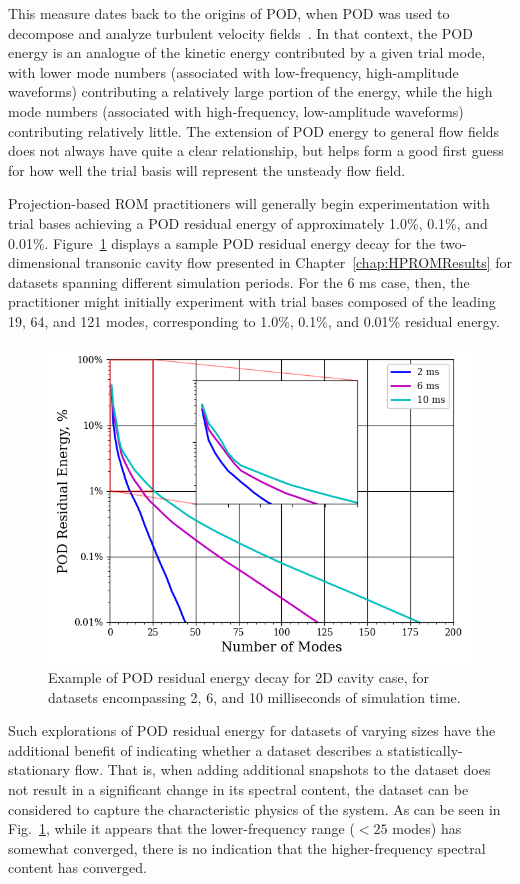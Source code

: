 This measure dates back to the origins of POD, when POD was used to decompose and analyze turbulent velocity fields~\cite{berkoozPOD}. In that context, the POD energy is an analogue of the kinetic energy contributed by a given trial mode, with lower mode numbers (associated with low-frequency, high-amplitude waveforms) contributing a relatively large portion of the energy, while the high mode numbers (associated with high-frequency, low-amplitude waveforms) contributing relatively little. The extension of POD energy to general flow fields does not always have quite a clear relationship, but helps form a good first guess for how well the trial basis will represent the unsteady flow field.

Projection-based ROM practitioners will generally begin experimentation with trial bases achieving a POD residual energy of approximately 1.0\%, 0.1\%, and 0.01\%. Figure~\ref{fig:samplePODEnergy} displays a sample POD residual energy decay for the two-dimensional transonic cavity flow presented in Chapter~\ref{chap:HPROMResults} for datasets spanning different simulation periods. For the 6 ms case, then, the practitioner might initially experiment with trial bases composed of the leading 19, 64, and 121 modes, corresponding to 1.0\%, 0.1\%, and 0.01\% residual energy.

\begin{figure}
	\centering
    \includegraphics[width=0.6\linewidth]{Chapters/ProjROMs/Images/pod_energy_2dCavity_example.png}
	\caption{\label{fig:samplePODEnergy}Example of POD residual energy decay for 2D cavity case, for datasets encompassing 2, 6, and 10 milliseconds of simulation time.}
\end{figure}

Such explorations of POD residual energy for datasets of varying sizes have the additional benefit of indicating whether a dataset describes a statistically-stationary flow. That is, when adding additional snapshots to the dataset does not result in a significant change in its spectral content, the dataset can be considered to capture the characteristic physics of the system. As can be seen in Fig.~\ref{fig:samplePODEnergy}, while it appears that the lower-frequency range ($< 25$ modes) has somewhat converged, there is no indication that the higher-frequency spectral content has converged.

